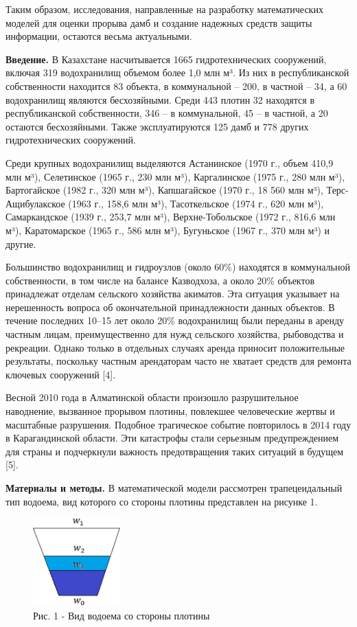 \begin{multicols}{2}
Таким образом, исследования, направленные на разработку математических
моделей для оценки прорыва дамб и создание надежных средств защиты
информации, остаются весьма актуальными.

{\bfseries Введение.} В Казахстане насчитывается 1665 гидротехнических
сооружений, включая 319 водохранилищ объемом более 1,0 млн м³. Из них в
республиканской собственности находится 83 объекта, в коммунальной --
200, в частной -- 34, а 60 водохранилищ являются бесхозяйными. Среди 443
плотин 32 находятся в республиканской собственности, 346 -- в
коммунальной, 45 -- в частной, а 20 остаются бесхозяйными. Также
эксплуатируются 125 дамб и 778 других гидротехнических сооружений.

Среди крупных водохранилищ выделяются Астанинское (1970 г., объем 410,9
млн м³), Селетинское (1965 г., 230 млн м³), Каргалинское (1975 г., 280
млн м³), Бартогайское (1982 г., 320 млн м³), Капшагайское (1970 г., 18
560 млн м³), Терс-Ащибулакское (1963 г., 158,6 млн м³), Тасоткельское
(1974 г., 620 млн м³), Самаркандское (1939 г., 253,7 млн м³),
Верхне-Тобольское (1972 г., 816,6 млн м³), Каратомарское (1965 г., 586
млн м³), Бугуньское (1967 г., 370 млн м³) и другие.

Большинство водохранилищ и гидроузлов (около 60\%) находятся в
коммунальной собственности, в том числе на балансе Казводхоза, а около
20\% объектов принадлежат отделам сельского хозяйства акиматов. Эта
ситуация указывает на нерешенность вопроса об окончательной
принадлежности данных объектов. В течение последних 10--15 лет около
20\% водохранилищ были переданы в аренду частным лицам, преимущественно
для нужд сельского хозяйства, рыбоводства и рекреации. Однако только в
отдельных случаях аренда приносит положительные результаты, поскольку
частным арендаторам часто не хватает средств для ремонта ключевых
сооружений {[}4{]}.

Весной 2010 года в Алматинской области произошло разрушительное
наводнение, вызванное прорывом плотины, повлекшее человеческие жертвы и
масштабные разрушения. Подобное трагическое событие повторилось в 2014
году в Карагандинской области. Эти катастрофы стали серьезным
предупреждением для страны и подчеркнули важность предотвращения таких
ситуаций в будущем {[}5{]}.

{\bfseries Материалы и методы.} В математической модели рассмотрен
трапецеидальный тип водоема, вид которого со стороны плотины представлен
на рисунке 1.
\end{multicols}

\begin{figure}[H]
	\centering
	\includegraphics[width=0.3\textwidth]{media/ict/image2}
	\caption*{Рис. 1 - Вид водоема со стороны плотины}
\end{figure}

